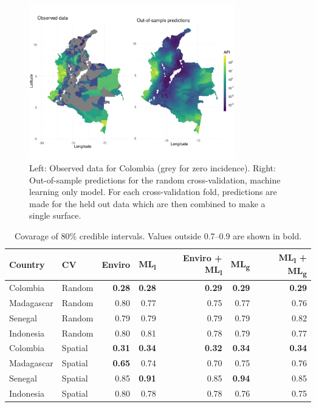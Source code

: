 \documentclass[11pt]{article}
\begin{document}
\begin{figure}
\centering
\includegraphics[trim={0 30mm 0 40mm}, width = 0.8\textwidth]{figs/col_obs_pred_map_ml.png} %
\caption{
  Left: Observed data for Colombia (grey for zero incidence). Right: Out-of-sample predictions for the random cross-validation, machine learning only model. For each cross-validation fold, predictions are made for the held out data which are then combined to make a single surface.
}
\label{f:map}
\end{figure}


\begin{table}[h!]
\caption{Covarage of 80\% credible intervals. Values outside 0.7--0.9 are shown in bold.}
\centering
\begin{tabular}{llrrrrr}
Country &  CV & Enviro & ML\textsubscript{l} &  Enviro + ML\textsubscript{l} & ML\textsubscript{g} & ML\textsubscript{l} + ML\textsubscript{g} \\
\hline 
 Colombia & Random & \textbf{0.28} & \textbf{0.28} & \textbf{0.29} & \textbf{0.29} & \textbf{0.29} \\
 Madagascar &  Random & 0.80 & 0.77& 0.75& 0.77& 0.76 \\
 Senegal & Random &0.79 & 0.79& 0.79& 0.79& 0.82 \\
 Indonesia & Random &0.80 & 0.81& 0.78& 0.79& 0.77  \\
 Colombia &  Spatial & \textbf{0.31} & \textbf{0.34}  & \textbf{0.32} & \textbf{0.34} & \textbf{0.34}  \\
 Madagascar & Spatial & \textbf{0.65} & 0.74& 0.70& 0.75 & 0.76   \\
 Senegal & Spatial & 0.85 & \textbf{0.91}& 0.85& \textbf{0.94} & 0.85  \\
  Indonesia & Spatial & 0.80 & 0.78& 0.78& 0.76& 0.75  \\
\end{tabular}
\label{t:coverage}
\end{table}
\end{document}
